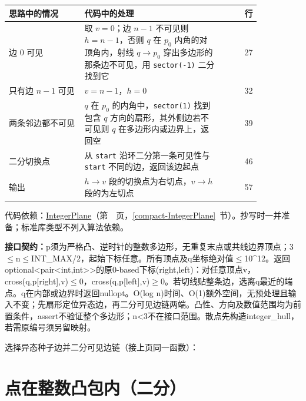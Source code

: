 \begin{center}\small
\begin{tabular}{@{}p{0.30\linewidth}p{0.55\linewidth}r@{}}
\toprule
思路中的情况 & 代码中的处理 & 行\\
\midrule
边 $0$ 可见 & 取 $v=0$；边 $n-1$ 不可见则 $h=n-1$，否则 $q$ 在 $p_0$ 内角的对顶角内，射线 $q\to p_0$ 穿出多边形的那条边不可见，用 \texttt{sector(-1)} 二分找到它 & 27\\
只有边 $n-1$ 可见 & $v=n-1$，$h=0$ & 32\\
两条邻边都不可见 & $q$ 在 $p_0$ 的内角中，\texttt{sector(1)} 找到包含 $q$ 方向的扇形，其外侧边若不可见则 $q$ 在多边形内或边界上，返回空 & 39\\
二分切换点 & 从 \texttt{start} 沿环二分第一条可见性与 \texttt{start} 不同的边，返回该边起点 & 46\\
输出 & $h\to v$ 段的切换点为右切点，$v\to h$ 段的为左切点 & 57\\
\bottomrule
\end{tabular}
\end{center}

代码依赖：\hyperref[compact-IntegerPlane]{IntegerPlane}（第~\pageref{compact-IntegerPlane}~页，\ref{compact-IntegerPlane}~节）。抄写时一并准备；标准库类型不列入算法依赖。

{\sloppy{}\noindent\textbf{接口契约：}p须为严格凸、逆时针的整数多边形，无重复末点或共线边界顶点；3$\le$n$\le$INT\_MAX/2，起始下标任意。所有顶点及q坐标绝对值$\le$10\textasciicircum{}12。返回optional<pair<int,int>>的原0-based下标(right,left)：对任意顶点v，cross(q,p[right],v)$\le$0，cross(q,p[left],v)$\ge$0。若切线贴整条边，选离q最近的端点。q在内部或边界时返回nullopt。O(log n)时间、O(1)额外空间，无预处理且输入不变；先扇形定位异态边，再二分可见边链两端。凸性、方向及数值范围均为前置条件，assert不验证整个多边形；n<3不在接口范围。散点先构造integer\_hull，若需原编号须另留映射。\par}

\Needspace{334pt}



\newpage

\noindent 选择异态种子边并二分可见边链（接上页同一函数）：



\Needspace{414pt}

\section{点在整数凸包内（二分）}\label{compact-convex_contains_i64}

